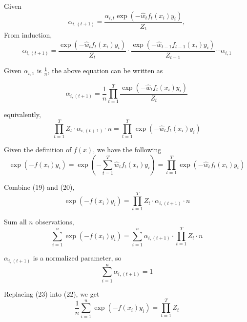 \begin{answer}

Given
\begin{equation}
    \alpha_{i, (t+1)}
 			= \frac{\alpha_{i, t} \exp(-\hat{w}_t f_t(x_i) y_i)}{Z_t},
\end{equation}
From induction,
\begin{equation}
    \alpha_{i, (t+1)}
 			= \frac{\exp(-\hat{w}_t f_t(x_i) y_i)}{Z_t} \cdot \frac{\exp(-\hat{w}_{t-1} f_{t-1}(x_i) y_i)}{Z_{t-1}} \cdots \alpha_{i, 1}
\end{equation}

Given $\alpha_{i, 1}$ is $\frac{1}{n}$, the above equation can be written as 

\begin{equation}
    \alpha_{i, (t+1)} = \frac{1}{n} \prod_{t=1}^T \frac{\exp(-\hat{w}_t f_t(x_i) y_i)}{Z_t}
\end{equation}

equivalently, 
\begin{equation}
    \prod_{t=1}^T Z_t \cdot \alpha_{i, (t+1)} \cdot n= \prod_{t=1}^T \exp(-\hat{w}_t f_t(x_i) y_i)
\end{equation}

Given the definition of $f(x)$, we have the following 
\begin{equation}
    \exp(-f(x_i)y_i) = \exp\left(-\sum_{t=1}^{T} \hat{w}_t f_t(x_i)y_i\right) = \prod_{t=1}^{T} \exp\left(-\hat{w}_t f_t(x_i)y_i\right)
\end{equation}


Combine (19) and (20), 
\begin{equation}
    \exp(-f(x_i)y_i) = \prod_{t=1}^T Z_t \cdot \alpha_{i, (t+1)} \cdot n
\end{equation}

Sum all $n$ observations, 
\begin{equation}
    \sum_{i=1}^{n} \exp(-f(x_i)y_i) = \sum_{i=1}^{n} \alpha_{i, (t+1)} \cdot \prod_{t=1}^T Z_t \cdot n
\end{equation}

$\alpha_{i, (t+1)}$ is a normalized parameter, so 
\begin{equation}
    \sum_{i=1}^{n} \alpha_{i, (t+1)} = 1
\end{equation}

Replacing (23) into (22), we get
\begin{equation}
    \frac{1}{n} \sum_{i=1}^n \exp(-f(x_i)y_i)= \prod_{t=1}^T Z_t
\end{equation}
\end{answer}